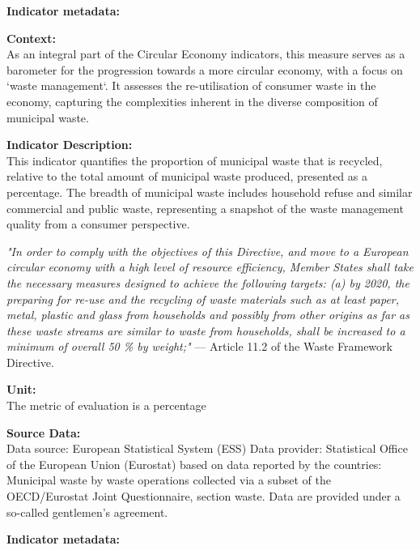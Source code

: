 \textbf{Indicator metadata:}   \href{https://ec.europa.eu/eurostat/cache/metadata/en/cei_wm011_esmsip2.htm}{\faExternalLink}

{\large\textbf{Context:}}  \\ \indent
As an integral part of the Circular Economy indicators, this measure serves as a barometer for the progression towards a more circular economy, with a focus on `waste management`. It assesses the re-utilisation of consumer waste in the economy, capturing the complexities inherent in the diverse composition of municipal waste.

{\large\textbf{Indicator Description:}}  \\ \indent
This indicator quantifies the proportion of municipal waste that is recycled, relative to the total amount of municipal waste produced, presented as a percentage. The breadth of municipal waste includes household refuse and similar commercial and public waste, representing a snapshot of the waste management quality from a consumer perspective.

\textit{"In order to comply with the objectives of this Directive, and move to a European circular economy with a high level of resource efficiency, Member States shall take the necessary measures designed to achieve the following targets: (a) by 2020, the preparing for re-use and the recycling of waste materials such as at least paper, metal, plastic and glass from households and possibly from other origins as far as these waste streams are similar to waste from households, shall be increased to a minimum of overall 50 \% by weight;"} --- Article 11.2 of the Waste Framework Directive.~\cite{eu2008wastedirective}

{\large\textbf{Unit:}}  \\ \indent
The metric of evaluation is a percentage

{\large\textbf{Source Data:}}  \\ \indent
Data source: European Statistical System (ESS)
Data provider: Statistical Office of the European Union (Eurostat) based on data reported by the countries: Municipal waste by waste operations \href{http://ec.europa.eu/eurostat/web/products-datasets/-/env_wasmun}{\faExternalLink} collected via a subset of the OECD/Eurostat Joint Questionnaire, section waste. Data are provided under a so-called gentlemen's agreement.

\textbf{Indicator metadata:}   \href{https://ec.europa.eu/eurostat/cache/metadata/en/cei_wm060_esmsip2.htm}{\faExternalLink}

